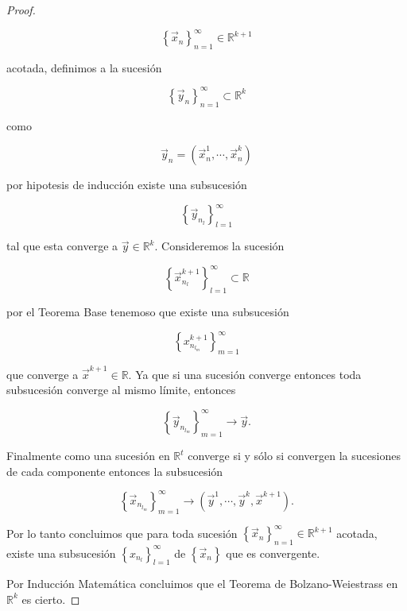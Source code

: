\documentclass[letterpaper]{article}
\theoremstyle{definition}
\theoremstyle{lemathm}
\theoremstyle{lemathm}
\theoremstyle{lemathm}
\theoremstyle{lemademthm}
\newcommand{\pars}[1]{\left( #1 \right) }
\newcommand{\set}[1]{\left \{ #1 \right\} }
\newcommand{\RR}{\mathbb{R}}
\newcommand{\1}{\mathbbm{1}}
\begin{document}
\begin{enumerate}
\begin{itemize}
\begin{proof}
\begin{itemize}
					\[\set{\vec{x}_n}_{n=1}^{\infty} \in \RR^{k+1}\]
					
					acotada, definimos a la sucesión 
					
					\[\set{\vec{y}_n}_{n=1}^{\infty}\subset\RR^k\]
					
					como 
					
					\[\vec{y}_n = \pars{\vec{x}_n^1,\cdots,\vec{x}_n^{k}}\]
					
					por hipotesis de inducción existe una subsucesión 
					
					\[\set{\vec{y}_{n_{l}}}_{l=1}^{\infty}\]
					
					tal que esta converge a $\vec{y}\in\RR^k$. Consideremos la sucesión 
					
					\[\set{\vec{x}^{k+1}_{n_{l}}}_{l=1}^{\infty}\subset\RR\]
					
					por el Teorema Base tenemoso que existe una subsucesión
					
					\[\set{x^{k+1}_{n_{l_{m}}}}_{m=1}^{\infty}\]
					
					que converge a $\vec{x}^{k+1}\in\RR$. Ya que si una sucesión converge entonces toda subsucesión converge al mismo límite, entonces
					
					\[\set{\vec{y}_{n_{l_{m}}}}_{m=1}^{\infty} \to \vec{y}.\]
					
					Finalmente como una sucesión en $\RR^{t}$ converge si y sólo si convergen la sucesiones de cada componente entonces la subsucesión
					
					\[\set{\vec{x}_{n_{l_{m}}}}_{m=1}^{\infty} \to \pars{\vec{y}^1,\cdots,\vec{y}^k,\vec{x}^{k+1}}.\]
					
					Por lo tanto concluimos que para toda sucesión $\set{\vec{x}_n}_{n=1}^{\infty} \in \RR^{k+1}$ acotada, existe una subsucesión $\set{x_{n_{l}}}_{l=1}^{\infty}$ de $\set{\vec{x}_n}$ que es convergente.
				\end{itemize}
	
				Por Inducción Matemática concluimos que el Teorema de Bolzano-Weiestrass en $\RR^k$ es cierto.

			\end{proof}

		\end{itemize}

	\end{enumerate}
\end{document}
